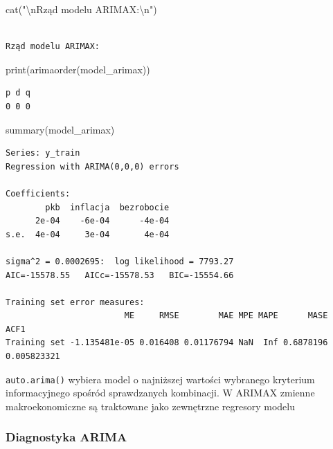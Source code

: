 \documentclass[
  polish,
  letterpaper,
  DIV=11,
  numbers=noendperiod]{scrartcl}
\newenvironment{Shaded}{\begin{snugshade}}{\end{snugshade}}
\newcommand{\FunctionTok}[1]{\textcolor[rgb]{0.28,0.35,0.67}{#1}}
\newcommand{\NormalTok}[1]{\textcolor[rgb]{0.00,0.23,0.31}{#1}}
\newcommand{\SpecialCharTok}[1]{\textcolor[rgb]{0.37,0.37,0.37}{#1}}
\newcommand{\StringTok}[1]{\textcolor[rgb]{0.13,0.47,0.30}{#1}}
\begin{document}
\begin{Shaded}
\begin{Highlighting}[]
\FunctionTok{cat}\NormalTok{(}\StringTok{"}\SpecialCharTok{\textbackslash{}n}\StringTok{Rząd modelu ARIMAX:}\SpecialCharTok{\textbackslash{}n}\StringTok{"}\NormalTok{)}
\end{Highlighting}
\end{Shaded}

\begin{verbatim}

Rząd modelu ARIMAX:
\end{verbatim}

\begin{Shaded}
\begin{Highlighting}[]
\FunctionTok{print}\NormalTok{(}\FunctionTok{arimaorder}\NormalTok{(model\_arimax))}
\end{Highlighting}
\end{Shaded}

\begin{verbatim}
p d q 
0 0 0 
\end{verbatim}

\begin{Shaded}
\begin{Highlighting}[]
\FunctionTok{summary}\NormalTok{(model\_arimax)}
\end{Highlighting}
\end{Shaded}

\begin{verbatim}
Series: y_train 
Regression with ARIMA(0,0,0) errors 

Coefficients:
        pkb  inflacja  bezrobocie
      2e-04    -6e-04      -4e-04
s.e.  4e-04     3e-04       4e-04

sigma^2 = 0.0002695:  log likelihood = 7793.27
AIC=-15578.55   AICc=-15578.53   BIC=-15554.66

Training set error measures:
                        ME     RMSE        MAE MPE MAPE      MASE        ACF1
Training set -1.135481e-05 0.016408 0.01176794 NaN  Inf 0.6878196 0.005823321
\end{verbatim}

\texttt{auto.arima()} wybiera model o najniższej wartości wybranego
kryterium informacyjnego spośród sprawdzanych kombinacji. W ARIMAX
zmienne makroekonomiczne są traktowane jako zewnętrzne regresory modelu

\subsubsection{Diagnostyka ARIMA}\label{diagnostyka-arima}
\end{document}
